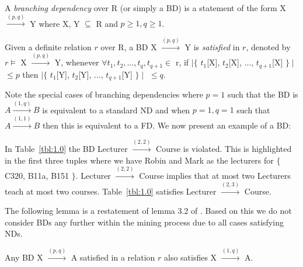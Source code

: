 \begin{definition}
\begin{rm}
A {\em branching dependency} over R (or simply a BD)
is a statement of the form X $\stackrel{(p,q)}{\to}$ Y where X, Y
$\subseteq$ R and $p \ge 1, q \ge 1$.
\end{rm}
\end{definition}
\begin{definition}[Satisfaction of a BD]
\begin{rm}
Given a definite relation $r$ over R, 
a BD X $\stackrel{(p,q)}{\to}$ Y is {\em satisfied} in $r$,
denoted by $r \models$ X $\stackrel{(p,q)}{\to}$ Y, whenever
$\forall t_1, t_2, \ldots, t_q, t_{q+1} \in$ r, if 
$\mid \{$ $t_1$[X], $t_2$[X], $\ldots$, $t_{q+1}$[X] $\} \mid$ $\le p$ then 
$\mid \{$ $t_1$[Y], $t_2$[Y], $\ldots$, $t_{q+1}$[Y] $\} \mid$ $\le q$.
\end{rm}
\end{definition}


Note the special  cases of branching dependencies
where $p = 1$ such that the BD is  $A 
\stackrel{(1,q)}{\rightarrow} B$
is equivalent to a standard ND and when
$ p = 1, q = 1$ such that  $A \stackrel{(1,1)}{\rightarrow} B$ then
this is equivalent to a FD. We now present an example of a BD:

\begin{example}
\begin{rm} 
In Table~\ref{tbl:1.0} the BD Lecturer $\stackrel{(2,2)}{\to}$ Course
is violated. This is highlighted in the first three tuples where we
have Robin and Mark as the lecturers for $\{$ C320, B11a, B151 $\}$. 
Lecturer $\stackrel{(2,2)}{\to}$ Course implies that at most two
Lecturers teach at most two courses. Table~\ref{tbl:1.0} satisfies 
Lecturer $\stackrel{(2,3)}{\to}$ Course.
\end{rm}
\end{example}

The following lemma is a
restatement of lemma 3.2 of \cite{dks92}. Based on this we do
not consider BDs any further within the mining process due to all
cases satisfying NDs.

\begin{lemma}\label{rev:lem_bd}
\begin{rm}
Any BD X $\stackrel{(p,q)}{\rightarrow}$ A satisfied in a relation $r$
also satisfies X $\stackrel{(1,q)}{\rightarrow}$ A.
\end{rm}
\end{lemma}

